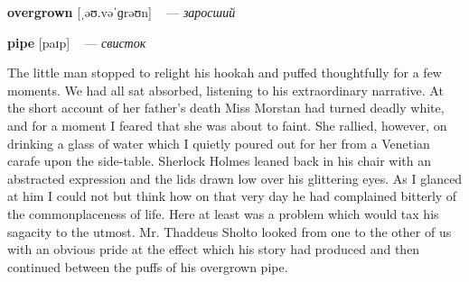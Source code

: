 \documentclass[a4paper,oneside,12pt]{amsart}
\begin{document}
{{\bf overgrown } [ˌəʊ.vəˈɡrəʊn] ~ --- \emph{ заросший }

{\bf pipe } [paɪp] ~ --- \emph{ свисток }

} \vspace{6mm} {\Large 

 
The little man stopped to relight his hookah and puffed thoughtfully for a few moments. We had all sat absorbed, listening to his extraordinary narrative. At the short account of her father's death Miss Morstan had turned deadly white, and for a moment I feared that she was about to faint. She rallied, however, on drinking a glass of water which I quietly poured out for her from a Venetian carafe upon the side-table. Sherlock Holmes leaned back in his chair with an abstracted expression and the lids drawn low over his glittering eyes. As I glanced at him I could not but think how on that very day he had complained bitterly of the commonplaceness of life. Here at least was a problem which would tax his sagacity to the utmost. Mr. Thaddeus Sholto looked from one to the other of us with an obvious pride at the effect which his story had produced and then continued between the puffs of his overgrown pipe.
\\ } 
\end{document}
